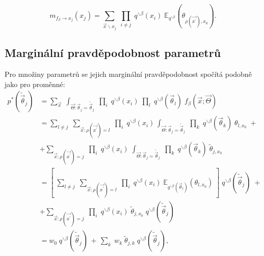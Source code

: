\begin{equation}
m_{f_\beta \rightarrow x_j}(x_j) =
    \sum_{\vec{x} \backslash x_j} \;
        \prod_{i \ne j}\;
            q^{\backslash \beta}(x_i)\;
            \mathbb{E}_{q^{\backslash \beta}}
                (\theta_{\rho(\vec{x^\prime}), x_0}).
\label{eq:msgfromftox}
\end{equation}

\subsection{Marginální pravděpodobnost parametrů}

Pro množiny parametrů se jejich marginální pravděpodobnost spočítá podobně jako
pro proměnné:
\begin{align}
p^*(\tilde{\vec{\theta}}_j) & = 
    \sum_{\vec{x}} \; 
    \int_{\vec{\Theta}: \vec{\theta}_j = \tilde{\vec{\theta}}_j} \;
         \prod_i \;
             q^{\backslash \beta}(x_i) \;
         \prod_l \;
    q^{\backslash \beta}(\vec{\theta}_l) \;
    f_\beta(\vec{x}; \vec{\Theta}) \label{eq:ep:theta_1}
\\
& = 
    \sum_{l \ne j} \;
        \sum_{\vec{x}: \rho(\vec{x^\prime}) = l} \;
            \prod_i \;
                q^{\backslash \beta}(x_i) \,
                \int_{\vec{\Theta}: \vec{\theta}_j = \tilde{\vec{\theta}}_j} \;
                    \prod_k \;
                        q^{\backslash \beta}(\vec{\theta}_k) \;
                        \theta_{l, x_0}\; + \label{eq:ep:theta_2}
\\
& + 
    \sum_{\vec{x}: \rho(\vec{x^\prime}) = j} \;
        \prod_i \;
            q^{\backslash \beta}(x_i) \;
            \int_{\vec{\Theta}: \vec{\theta}_j = \tilde{\vec{\theta}}_j} \;
                \prod_k \;
                    q^{\backslash \beta}(\vec{\theta}_k) \; 
                    \tilde{\theta}_{j, x_0}
\nonumber
\\
& = 
    \left[ \;
        \sum_{l \ne j} \;
            \sum_{\vec{x}: \rho(\vec{x^\prime}) = l} \;
                \prod_i \;
                    q^{\backslash \beta}(x_i) \;
                    \mathbb{E}_{q^{\backslash \beta}(\vec{\theta}_l)} (\theta_{l, x_0}) \;
    \right] \;
    q^{\backslash \beta}(\tilde{\vec{\theta}}_j) \; + \label{eq:ep:theta_3}
\\
& + 
    \sum_{\vec{x}: \rho(\vec{x^\prime}) = j} \;
        \prod_i \;
            q^{\backslash \beta}(x_i) \;
            \tilde{\theta}_{j,x_0} \;
            q^{\backslash \beta}(\tilde{\vec{\theta}}_j) \;
\label{eq:ep:theta_4}
\nonumber
\\
& = w_0 \; q^{\backslash \beta}(\tilde{\vec{\theta}}_j) \, + \, \sum_k \; w_k \;
    \tilde{\theta}_{j,k} \; q^{\backslash \beta}(\tilde{\vec{\theta}}_j),
\end{align}


